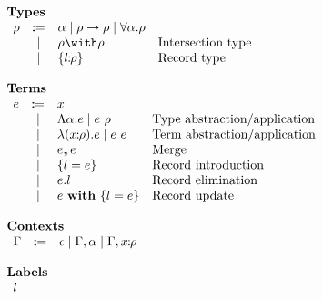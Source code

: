 \[
\begin{array}{l}

    \textbf{Types} \\
    \begin{array}{rcll}
        \ty & \dcoloneq & \alpha \mid \ty \to \ty \mid \forall \alpha. \ty & \\
          & \mid      & \ty \with \ty                                  & \text{Intersection type} \\
          & \mid      & \recordtype l \ty                            & \text{Record type}
    \end{array} \\ \\

    \textbf{Terms} \\
    \begin{array}{rcll}
        e & \dcoloneq & x                               & \\
          & \mid      & \Abs \alpha     e \mid \app e \ty & \text{Type abstraction/application} \\
          & \mid      & \abs {\rel x \ty} e \mid \app e e & \text{Term abstraction/application} \\
          & \mid      & e \dcomma e                     & \text{Merge} \\
          & \mid      & \recordintro l e                & \text{Record introduction} \\
          & \mid      & e.l                             & \text{Record elimination} \\
          & \mid      & \recordupdate e l e             & \text{Record update}
    \end{array} \\ \\

    \textbf{Contexts} \\
    \begin{array}{rcl}
        \Gamma & \dcoloneq & \epsilon \mid \Gamma, \alpha \mid \Gamma, \rel x \ty
    \end{array} \\ \\

    \textbf{Labels} \\
    \begin{array}{r}
        l
    \end{array}

\end{array}
\]
